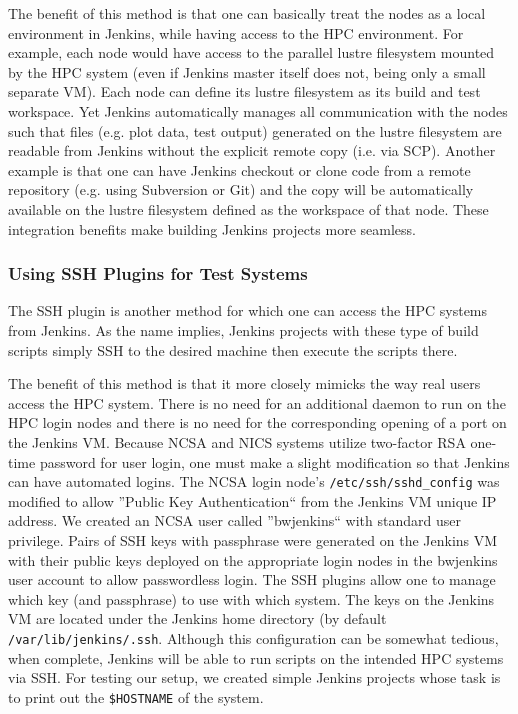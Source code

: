 \documentclass[10pt, conference, compsocconf]{IEEEtran}
\begin{document}
The benefit of this method is that one can basically treat the nodes as a local environment in Jenkins, while having access to the HPC environment. 
For example, each node would have access to the parallel lustre filesystem mounted by the HPC system (even if Jenkins master itself does not, being only a small separate VM). 
Each node can define its lustre filesystem as its build and test workspace. 
Yet Jenkins automatically manages all communication with the nodes such that files (e.g. plot data, test output) generated on the lustre filesystem are readable from Jenkins without the explicit remote copy (i.e. via SCP). 
Another example is that one can have Jenkins checkout or clone code from a remote repository (e.g. using Subversion or Git) and the copy will be automatically available on the lustre filesystem defined as the workspace of that node. 
These integration benefits make building Jenkins projects more seamless.

\subsubsection{Using SSH Plugins for Test Systems}
The SSH plugin \cite{JenkinsSSHPlugin} is another method for which one can access the HPC systems from Jenkins. 
As the name implies, Jenkins projects with these type of build scripts simply SSH to the desired machine then execute the scripts there. 


The benefit of this method is that it more closely mimicks the way real users access the HPC system. 
There is no need for an additional daemon to run on the HPC login nodes and there is no need for the corresponding opening of a port on the Jenkins VM. 
Because NCSA and NICS systems utilize two-factor RSA one-time password for user login, one must make a slight modification so that Jenkins can have automated logins. 
The NCSA login node's \texttt{/etc/ssh/sshd_config} was modified to allow ''Public Key Authentication`` from the Jenkins VM unique IP address. 
We created an NCSA user called ''bwjenkins`` with standard user privilege. 
Pairs of SSH keys with passphrase were generated on the Jenkins VM with their public keys deployed on the appropriate login nodes in the bwjenkins user account to allow passwordless login. 
The SSH plugins allow one to manage which key (and passphrase) to use with which system. 
The keys on the Jenkins VM are located under the Jenkins home directory (by default \texttt{/var/lib/jenkins/.ssh}. 
Although this configuration can be somewhat tedious, when complete, Jenkins will be able to run scripts on the intended HPC systems via SSH. 
For testing our setup, we created simple Jenkins projects whose task is to print out the \texttt{\$HOSTNAME} of the system.
\end{document}
